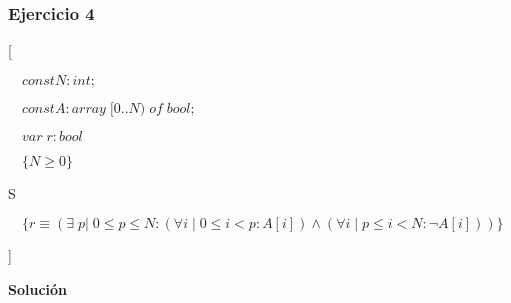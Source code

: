 \documentclass[hidelinks]{article}
\begin{document}
\newpage


\subsubsection{Ejercicio 4}
[\par
$\quad const N: int;$\par
$\quad const A: array \; [0..N) \; of \; bool;$\par
$\quad var \; r: bool$\par
$\quad \{N \geq 0\}$\par
\hspace{1em} S \par
$\quad \{r \equiv (\exists \; p| \; 0 \leq p \leq N : (\forall i \;|\; 0 \leq i < p:A[i]) \land (\forall i \;|\; p \leq i < N: \neg A[i]))\}$ \par
]

\newpage

\textbf{Solución}
\end{document}
